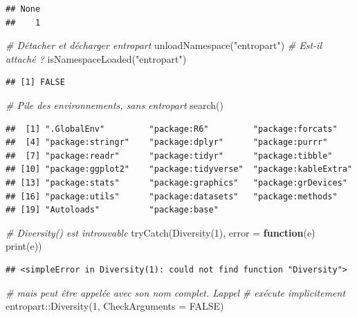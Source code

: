 \documentclass[
  11pt,
  french,
  a4paper,
  extrafontsizes,onecolumn,openright
  ]{memoir}
\newenvironment{Shaded}{\begin{snugshade}}{\end{snugshade}}
\newcommand{\AttributeTok}[1]{\textcolor[rgb]{0.77,0.63,0.00}{#1}}
\newcommand{\CommentTok}[1]{\textcolor[rgb]{0.56,0.35,0.01}{\textit{#1}}}
\newcommand{\ConstantTok}[1]{\textcolor[rgb]{0.00,0.00,0.00}{#1}}
\newcommand{\ControlFlowTok}[1]{\textcolor[rgb]{0.13,0.29,0.53}{\textbf{#1}}}
\newcommand{\DecValTok}[1]{\textcolor[rgb]{0.00,0.00,0.81}{#1}}
\newcommand{\FunctionTok}[1]{\textcolor[rgb]{0.00,0.00,0.00}{#1}}
\newcommand{\NormalTok}[1]{#1}
\newcommand{\SpecialCharTok}[1]{\textcolor[rgb]{0.00,0.00,0.00}{#1}}
\newcommand{\StringTok}[1]{\textcolor[rgb]{0.31,0.60,0.02}{#1}}
\begin{document}
\begin{verbatim}
## None 
##    1
\end{verbatim}

\begin{Shaded}
\begin{Highlighting}[]
\CommentTok{\# Détacher et décharger entropart}
\FunctionTok{unloadNamespace}\NormalTok{(}\StringTok{"entropart"}\NormalTok{)}
\CommentTok{\# Est{-}il attaché ?}
\FunctionTok{isNamespaceLoaded}\NormalTok{(}\StringTok{"entropart"}\NormalTok{)}
\end{Highlighting}
\end{Shaded}

\begin{verbatim}
## [1] FALSE
\end{verbatim}

\begin{Shaded}
\begin{Highlighting}[]
\CommentTok{\# Pile des environnements, sans entropart}
\FunctionTok{search}\NormalTok{()}
\end{Highlighting}
\end{Shaded}

\begin{verbatim}
##  [1] ".GlobalEnv"         "package:R6"         "package:forcats"   
##  [4] "package:stringr"    "package:dplyr"      "package:purrr"     
##  [7] "package:readr"      "package:tidyr"      "package:tibble"    
## [10] "package:ggplot2"    "package:tidyverse"  "package:kableExtra"
## [13] "package:stats"      "package:graphics"   "package:grDevices" 
## [16] "package:utils"      "package:datasets"   "package:methods"   
## [19] "Autoloads"          "package:base"
\end{verbatim}

\begin{Shaded}
\begin{Highlighting}[]
\CommentTok{\# Diversity() est introuvable}
\FunctionTok{tryCatch}\NormalTok{(}\FunctionTok{Diversity}\NormalTok{(}\DecValTok{1}\NormalTok{), }\AttributeTok{error =} \ControlFlowTok{function}\NormalTok{(e) }\FunctionTok{print}\NormalTok{(e))}
\end{Highlighting}
\end{Shaded}

\begin{verbatim}
## <simpleError in Diversity(1): could not find function "Diversity">
\end{verbatim}

\begin{Shaded}
\begin{Highlighting}[]
\CommentTok{\# mais peut être appelée avec son nom complet.  L\textquotesingle{}appel}
\CommentTok{\# exécute implicitement}
\NormalTok{entropart}\SpecialCharTok{::}\FunctionTok{Diversity}\NormalTok{(}\DecValTok{1}\NormalTok{, }\AttributeTok{CheckArguments =} \ConstantTok{FALSE}\NormalTok{)}
\end{Highlighting}
\end{Shaded}
\end{document}
